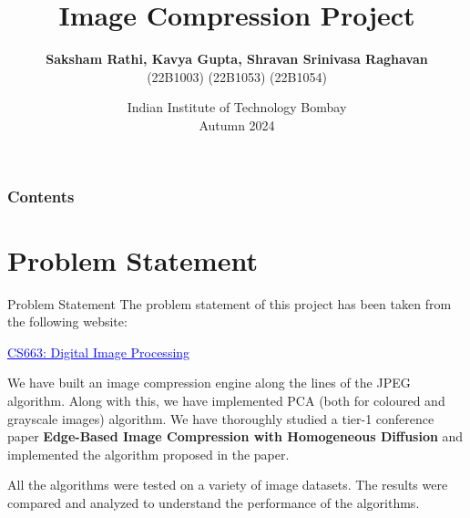 \documentclass[Serif, 10pt, brown]{beamer}
\title[{Image Compression}]{\sc Image Compression Project}
\author[\ul{Authors}]{{\bf Saksham Rathi, Kavya Gupta, Shravan Srinivasa Raghavan}\\ \hspace{-1cm} (22B1003) \hspace{0.7cm} (22B1053) \hspace{1.7cm} (22B1054)}
\institute[UTD]{\sc\small CS663: Digital Image Processing\\ Under Prof. Ajit Rajwade}
\date[UCI]{Indian Institute of Technology Bombay \\ Autumn 2024}
\theoremstyle{example}
\theoremstyle{plain}
\begin{document}
\frame{\titlepage}
%
%


\begin{frame}
	\transblindsvertical
	\frametitle{Contents}
	\tableofcontents[hidesubsections]
\end{frame}


\section[Problem Statement]{Problem Statement}
% 
\begin{frame}{Problem Statement}
	The problem statement of this project has been taken from the following website:
	\begin{center}
		\href{https://www.cse.iitb.ac.in/~ajitvr/CS663_Fall2024/project.html}{\textcolor{blue}{\underline{CS663: Digital Image Processing}}}
	\end{center}

	We have built an image compression engine along the lines of the JPEG algorithm. Along with this, we have implemented PCA (both for coloured and grayscale images) algorithm. We have thoroughly studied a tier-1 conference paper {\bf Edge-Based Image Compression with Homogeneous Diffusion} and implemented the algorithm proposed in the paper.
	\vspace{1cm}

	All the algorithms were tested on a variety of image datasets. The results were compared and analyzed to understand the performance of the algorithms.
\end{frame}
\end{document}
